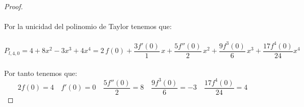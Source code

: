 \documentclass[11pt,letterpaper]{article}
\begin{document}
\begin{proof}
\begin{equation*}
    \end{equation*}\,\\
    Por la unicidad del polinomio de Taylor tenemos que:\,\\
    \,\\
    \begin{equation*}
        P_{l,4,0}=4+8x^2-3x^3+4x^4=2\,f(0)+\frac{3f'(0)}{1}\,x+\frac{5f''(0)}{2}\,x^2+\frac{9f^3(0)}{6}\,x^3+\frac{17f^4(0)}{24}x^4
    \end{equation*}\,\\
    Por tanto tenemos que:\,\\
    \begin{equation*}
        2f(0)=4\,\,\,\,\,\,f'(0)=0\,\,\,\,\,\,\frac{5f''(0)}{2}=8\,\,\,\,\,\,\frac{9f^3(0)}{6}=-3\,\,\,\,\,\,\frac{17f^4(0)}{24}=4
    \end{equation*}
    
\end{proof}
\end{document}
